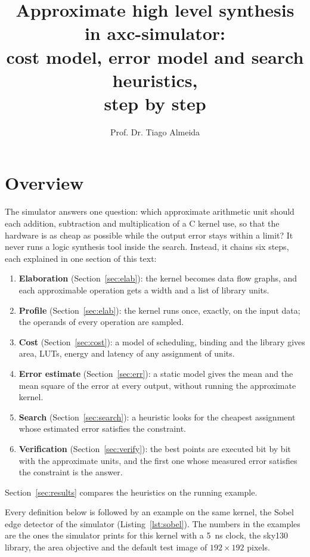 \documentclass[11pt,a4paper]{article}
\title{Approximate high level synthesis in axc-simulator:\\ cost model, error model and search heuristics,\\ step by step}
\author{Prof. Dr. Tiago Almeida}
\date{}
\begin{document}
\maketitle

\section{Overview}

The simulator answers one question: which approximate arithmetic unit should each addition, subtraction and
multiplication of a C kernel use, so that the hardware is as cheap as possible while the output error stays within a
limit? It never runs a logic synthesis tool inside the search. Instead, it chains six steps, each explained in one
section of this text:

\begin{enumerate}
  \item \textbf{Elaboration} (Section~\ref{sec:elab}): the kernel becomes data flow graphs, and each approximable
    operation gets a width and a list of library units.
  \item \textbf{Profile} (Section~\ref{sec:elab}): the kernel runs once, exactly, on the input data; the operands of
    every operation are sampled.
  \item \textbf{Cost} (Section~\ref{sec:cost}): a model of scheduling, binding and the library gives area, LUTs,
    energy and latency of any assignment of units.
  \item \textbf{Error estimate} (Section~\ref{sec:err}): a static model gives the mean and the mean square of the error
    at every output, without running the approximate kernel.
  \item \textbf{Search} (Section~\ref{sec:search}): a heuristic looks for the cheapest assignment whose estimated
    error satisfies the constraint.
  \item \textbf{Verification} (Section~\ref{sec:verify}): the best points are executed bit by bit with the
    approximate units, and the first one whose measured error satisfies the constraint is the answer.
\end{enumerate}
Section~\ref{sec:results} compares the heuristics on the running example.

Every definition below is followed by an example on the same kernel, the Sobel edge detector of the simulator
(Listing~\ref{lst:sobel}). The numbers in the examples are the ones the simulator prints for this kernel with a
5~ns clock, the sky130 library, the area objective and the default test image of $192 \times 192$ pixels.
\end{document}
